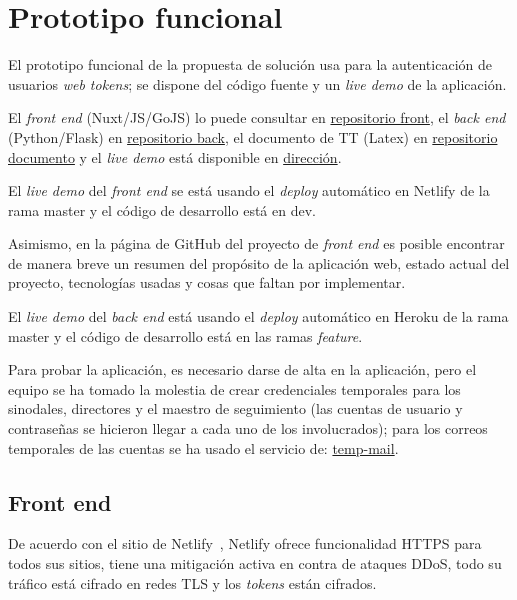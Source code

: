 \section{Prototipo funcional}

El prototipo funcional de la propuesta de solución usa para la autenticación de usuarios \textit{web tokens}; se dispone del código fuente y un \textit{live demo} de la aplicación.


El \textit{front end} (Nuxt/JS/GoJS) lo puede consultar en \href{https://github.com/martinez-acosta/TT-2019-B052}{repositorio front}, el \textit{back end} (Python/Flask) en \href{https://github.com/omaraparicio07/api-tt-2019-b052}{repositorio back}, el documento de TT (Latex) en \href{https://github.com/martinez-acosta/DOCS-TT-2019-B052}{repositorio documento} y el \textit{live demo} está disponible en \href{https://serene-haibt-2239b4.netlify.app/}{dirección}.


El \textit{live demo} del \textit{front end} se está usando el \textit{deploy} automático en Netlify de la rama master y el código de desarrollo está en dev.


Asimismo, en la página de GitHub del proyecto de \textit{front end} es posible encontrar de manera breve un resumen del propósito de la aplicación web, estado actual del proyecto, tecnologías usadas y cosas que faltan por implementar.


El \textit{live demo} del \textit{back end} está usando el \textit{deploy} automático en Heroku de la rama master y el código de desarrollo está en las ramas \textit{feature}.


Para probar la aplicación, es necesario darse de alta en la aplicación, pero el equipo se ha tomado la molestia de crear credenciales temporales para los sinodales, directores y el maestro de seguimiento (las cuentas de usuario y contraseñas se hicieron llegar a cada uno de los involucrados); para los correos temporales de las cuentas se ha usado el servicio de: \href{https://temp-mail.org/es/}{temp-mail}.

\subsection*{Front end}

De acuerdo con el sitio de Netlify~\cite{netlify_netlify_nodate}, Netlify ofrece funcionalidad HTTPS para todos sus sitios, tiene una mitigación activa en contra de ataques DDoS, todo su tráfico está cifrado en redes TLS y los \textit{tokens} están cifrados.

